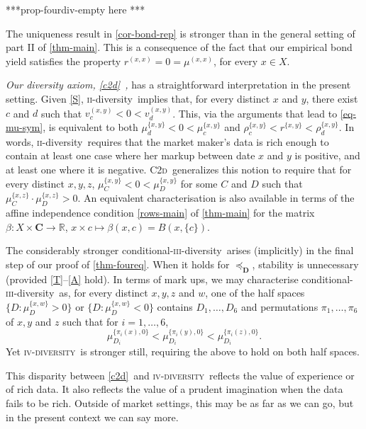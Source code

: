 \documentclass[ecta,nameyear,draft]{econsocart}
\newcommand{\R}{\mathbb R}
\newcommand{\mbbd}{{\mathbf D}}
\newcommand{\mbbc}{{\mathbf C}}
\newcommand{\xx}{(x,x)}
\newcommand{\xy}{{(x, y)}}
\newcommand{\stability}{\ref{S}}
\newcommand{\Condtwodiv}{\textsc{C2d}}
\newcommand{\condthreediv}{\textup{conditional-\textsc{iii}-diversity}}
\newcommand{\twodiv}{\textsc{ii}-\textup{diversity}}
\newcommand{\fourdiv}{\textsc{iv}-\textsc{diversity}}
\theoremstyle{plain}
\theoremstyle{remark}
\newcounter{word}
\begin{document}
***prop-fourdiv-empty here ***

The uniqueness result in \cref{cor-bond-rep} is stronger than in the general
setting of part II of \cref{thm-main}. This is a consequence of the fact that
our empirical bond yield satisfies the property $r^{\xx} = 0 = \mu^{\xx}$, for
every $x \in X$. 

\emph{Our diversity axiom, \ref{c2d}\ ,} has a straightforward
interpretation in the present setting. Given \stability, \twodiv\ implies that,
for every distinct $x$ and $y$, there exist $c$ and $d$ such that $v^{\xy}_{c}
< 0 < v^{\xy}_{d}$.  This, via the arguments that lead to \cref{eq-mu-sym}, is
equivalent to both $\mu^{\{x,y\}}_{d} < 0 < \mu^{\{x,y\}}_{c}$ and
$\rho^{\{x,y\}}_{c} < r^{\{x,y\}} < \rho^{\{x,y\}}_{d}$.  In words, \twodiv\
requires that the market maker's data is rich enough to contain at least one
case where her markup between date $x$ and $y$ is positive, and at least one
where it is negative.
\Condtwodiv\ {generalizes} this notion to require that for every distinct $x,
y, z$, $\mu^{\{x,y\}}_{C} < 0 < \mu^{\{x,y\}}_{D}$ for some $C$ and $D$ such
that $\mu^{\{x,z\}}_{C}\cdot \mu^{\{x,z\}}_{D} >0$. An equivalent
characterisation is also available in terms of the affine independence
condition \ref{rows-main} of \cref{thm-main} for the matrix $\beta: X \times
\mbbc \rightarrow \R$, $x\times c \mapsto \beta(x, c) = B(x, \{c\})$.

The considerably stronger \condthreediv\ arises (implicitly) in
the final step of our proof of \cref{thm-foureq}. When it holds for
$\preceq_{\mbbd}$, {stability} is unnecessary (provided \ref{T}--\ref{A} hold).
In terms of mark ups, we may characterise \condthreediv\ as,
for every distinct $x, y, z$ and $w$, one of the half spaces $\{D :
\mu^{\{x,w\}}_D > 0\}$ or $\{D: \mu^{\{x,w\}}_D < 0\}$ contains $D_1, \dots,
D_6$ and permutations $\pi_1, \dots, \pi_6$ of $x, y$ and $z$ such that for
$i=1,\dots,6$, 
\begin{equation*}
  \mu^{\{\pi_i(x),0\}}_{D_i} < \mu^{\{\pi_i(y),0\}}_{D_i} <
  \mu^{\{\pi_i(z),0\}}_{D_i}.
\end{equation*}
Yet \fourdiv\ is stronger still, requiring the above to hold on both half
spaces.

This disparity between \ref{c2d}\ and \fourdiv\ reflects the value of
experience or of rich data. It also reflects the value of a prudent imagination
when the data fails to be rich.  Outside of market settings, this may be as far
as we can go, but in the present context we can say more.
\end{document}
